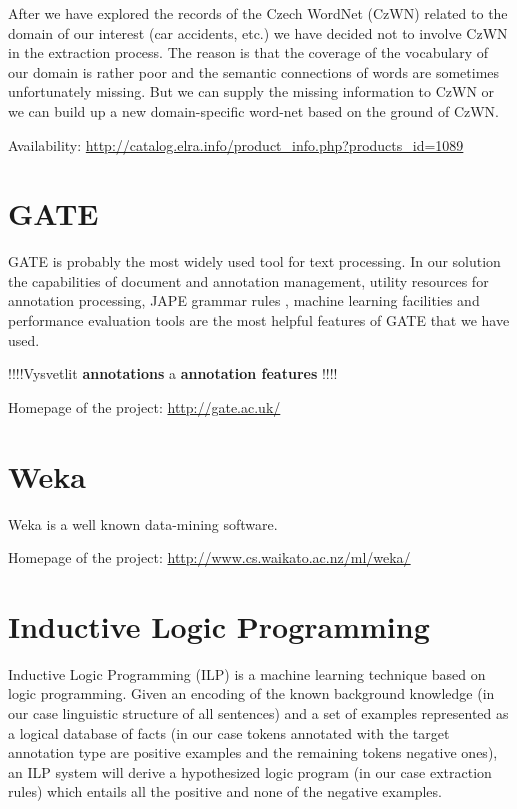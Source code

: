 After we have explored the records of the Czech WordNet (CzWN) related to the domain of our interest (car accidents, etc.) we have decided not to involve CzWN in the extraction process. The reason is that the coverage of the vocabulary of our domain is rather poor and the semantic connections of words are sometimes unfortunately missing. But we can supply the missing information to CzWN or we can build up a new domain-specific word-net based on the ground of CzWN.  

\medskip
Availability: \url{http://catalog.elra.info/product_info.php?products_id=1089}



\section{GATE} \label{sec:ch30_gate}
GATE \citep{biblio:GATE_ACL2002} is probably the most widely used tool for text processing. In our solution the capabilities of document and annotation management, utility resources for annotation processing, JAPE grammar rules \citep{Cunningham00jape:a}, machine learning facilities and performance evaluation tools are the most helpful features of GATE that we have used.

!!!!Vysvetlit \textbf{annotations} a \textbf{annotation features} !!!!

\medskip
Homepage of the project: \url{http://gate.ac.uk/}


\section{Weka}

Weka \citep{biblio:Weka} is a well known data-mining software.

\medskip
Homepage of the project: \url{http://www.cs.waikato.ac.nz/ml/weka/}


\section{Inductive Logic Programming}
Inductive Logic Programming (ILP) \citep{biblio:MuggletonILP} is a machine learning technique based on logic programming. Given an encoding of the known background knowledge (in our case linguistic structure of all sentences) and a set of examples represented as a logical database of facts (in our case tokens annotated with the target annotation type are positive examples and the remaining tokens negative ones), an ILP system will derive a hypothesized logic program (in our case extraction rules) which entails all the positive and none of the negative examples.

